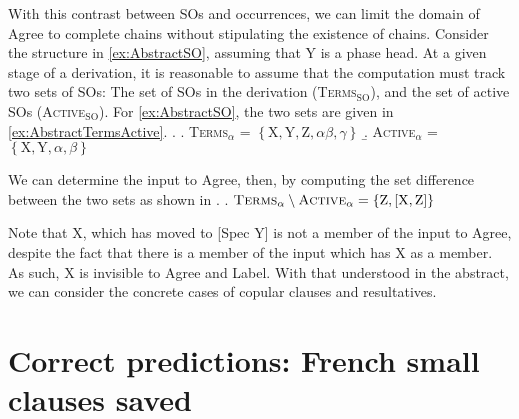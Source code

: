\documentclass[MilwayThesis]{subfiles}
\begin{document}
With this contrast between SOs and occurrences, we can limit the domain of Agree to complete chains without stipulating the existence of chains.
Consider the structure in \cref{ex:AbstractSO}, assuming that Y is a phase head. 
At a given stage of a derivation, it is reasonable to assume that the computation must track two sets of SOs: The set of SOs in the derivation (\textsc{Terms}$_\text{SO}$), and the set of active SOs (\textsc{Active}$_\text{SO}$).
For \cref{ex:AbstractSO}, the two sets are given in \cref{ex:AbstractTermsActive}.
\ex. \label{ex:AbstractTermsActive}
\a. \textsc{Terms}$_\alpha$ = $\left\{ \text{X}, \text{Y}, \text{Z}, \alpha \beta, \gamma  \right\}$
\b. \textsc{Active}$_\alpha$ = $\left\{ \text{X}, \text{Y}, \alpha, \beta \right\}$

We can determine the input to Agree, then, by computing the set difference between the two sets as shown in \Next.
\ex.\label{ex:AbstractAgrInput} $\textsc{Terms}_\alpha \setminus \textsc{Active}_\alpha = \left\{ \text{Z}, \left[ \text{X}, \text{Z} \right] \right\}$ 

Note that X, which has moved to [Spec Y] is not a member of the input to Agree, despite the fact that there is a member of the input which has X as a member.
As such, X is invisible to Agree and Label.
With that understood in the abstract, we can consider the concrete cases of copular clauses and resultatives.


\section{Correct predictions: French small clauses saved}\label{sec:FreSaved}
\end{document}
